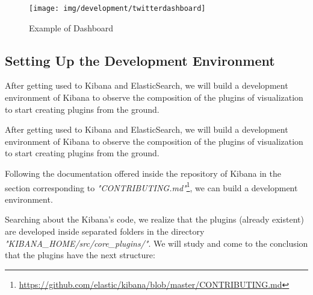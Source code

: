 \documentclass[a4paper, 12pt]{book}
\begin{document}
\begin{figure}[H]
  \centering
  \texttt{[image: img/development/twitterdashboard]}
  \caption{Example of Dashboard}
  \label{fig:twitterdashboard}
\end{figure}


\subsection{Setting Up the Development Environment}

After getting used to Kibana and ElasticSearch, we will build a development environment of Kibana to observe the composition of the plugins of visualization to start creating plugins from the ground.

After getting used to Kibana and ElasticSearch, we will build a development environment of Kibana to observe the composition of the plugins of visualization to start creating plugins from the ground.

Following the documentation offered inside the repository of Kibana in the section corresponding to \textit{"CONTRIBUTING.md"}\footnote{\url{https://github.com/elastic/kibana/blob/master/CONTRIBUTING.md}}, we can build a development environment.

Searching about the Kibana’s code, we realize that the plugins (already existent) are developed inside separated folders in the directory \textit{"KIBANA\_HOME/src/core\_plugins/"}. We will study and come to the conclusion that the plugins have the next structure:
\end{document}
